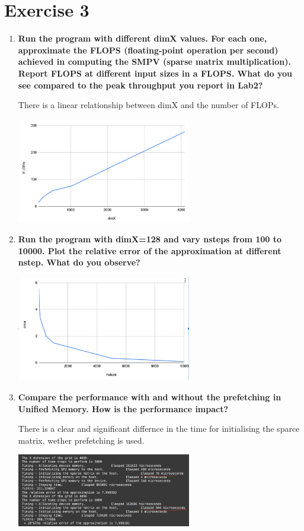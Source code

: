 \documentclass[a4paper,11pt]{scrartcl}
\begin{document}
\section*{Exercise 3}


\begin{enumerate}

    \item \textbf{Run the program with different dimX values. For each one, approximate the FLOPS (floating-point operation per second) achieved in computing the SMPV (sparse matrix multiplication). Report FLOPS at different input sizes in a FLOPS. What do you see compared to the peak throughput you report in Lab2?}

    There is a linear relationship between dimX and the number of FLOPs.

    \includegraphics*[width=0.6\textwidth]{images/flops.png}

    \item \textbf{Run the program with dimX=128 and vary nsteps from 100 to 10000. Plot the relative error of the approximation at different nstep. What do you observe?}

    \includegraphics*[width=0.6\textwidth]{images/nsteps.png}

    \item \textbf{Compare the performance with and without the prefetching in Unified Memory. How is the performance impact?}

    There is a clear and significant differnce in the time for initialising the sparce matrix, wether prefetching is used.

    \includegraphics*[width=0.6\textwidth]{images/prefetch.png}

\end{enumerate}
\end{document}
